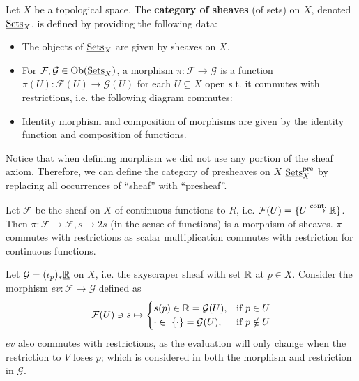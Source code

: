 \documentclass{article}
\begin{document}
\begin{definition}
    Let $X$ be a topological space. The \textbf{category of sheaves} (of sets) on $X$, denoted $\underline{\textup{Sets}}_X$, is defined by providing the following data:
    \begin{itemize}
        \item The objects of $\underline{\textup{Sets}}_X$ are given by sheaves on $X$.
        \item For $\mathcal{F}, \mathcal{G} \in \mathrm{Ob}(\underline{\textup{Sets}}_X)$, a morphism $\pi: \mathcal{F} \to \mathcal{G}$ is a function $\pi(U): \mathcal{F}(U) \to \mathcal{G}(U)$ for each $U \subseteq X$ open s.t. it commutes with restrictions, i.e. the following diagram commutes:
        
        \begin{minipage}{\linewidth}
            \centering
        \end{minipage}
        \item Identity morphism and composition of morphisms are given by the identity function and composition of functions.
    \end{itemize}
    Notice that when defining morphism we did not use any portion of the sheaf axiom. Therefore, we can define the category of presheaves on $X$ $\underline{\textup{Sets}}_X^{\text{pre}}$ by replacing all occurrences of ``sheaf'' with ``presheaf''.
\end{definition}

\begin{example}
    Let $\mathcal{F}$ be the sheaf on $X$ of continuous functions to $R$, i.e. $\mathcal{F}(U) = \{ U \overset{\text{cont.}}{\longrightarrow} \mathbb{R} \}$. Then $\pi: \mathcal{F} \to \mathcal{F}, s \mapsto 2s$ (in the sense of functions) is a morphism of sheaves. $\pi$ commutes with restrictions as scalar multiplication commutes with restriction for continuous functions.

    Let $\mathcal{G} = (\iota_p)_{\ast} \underline{\mathbb{R}}$ on $X$, i.e. the skyscraper sheaf with set $\mathbb{R}$ at $p \in X$. Consider the morphism $ev: \mathcal{F} \to \mathcal{G}$ defined as
    \[
        \mathcal{F}(U) \ni s \mapsto
        \begin{cases}
            s(p) \in \mathbb{R} = \mathcal{G}(U), & \text{if $p \in U$} \\
            \cdot \in \ \{ \cdot \} = \mathcal{G}(U), & \text{if $p \notin U$}
        \end{cases}
    \]
    $ev$ also commutes with restrictions, as the evaluation will only change when the restriction to $V$ loses $p$; which is considered in both the morphism and restriction in $\mathcal{G}$.
\end{example}
\end{document}
